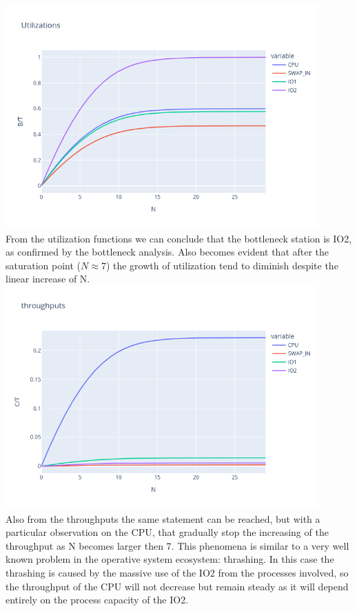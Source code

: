 \documentclass[12pt,a4paper]{article}
\begin{document}
\includegraphics[width=0.9\textwidth]{./Images/Utilizations.png}\\
From the utilization functions we can conclude that the bottleneck station is IO2, as confirmed by the bottleneck analysis. Also becomes evident that after the saturation point ($N \approx7$) the growth of utilization tend to diminish despite the linear increase of N.
\\
\includegraphics[width=0.9\textwidth]{Images/throughputs.png}
\\
Also from the throughputs the same statement can be reached, but with a particular observation on the CPU, that gradually stop the increasing of the throughput as N becomes larger then 7. This phenomena is similar to a very well known problem in the operative system ecosystem: thrashing. In this case the thrashing is caused by the massive use of the IO2 from the processes involved, so the throughput of the CPU will not decrease but remain steady as it will depend entirely on the process capacity of the IO2.
\end{document}
